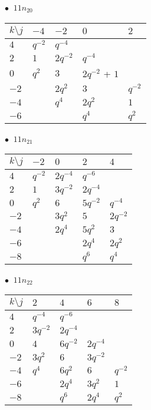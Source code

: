 %
\begin{minipage}{\linewidth}
$\bullet\ $ $11n_{20}$ \vspace{0.5em} \\
\begin{tabular}{l|llll}
$k \setminus j$ & $-4$ & $-2$ & $0$ & $2$ \\
\hline
$4$ & $q^{-2}$ & $q^{-4}$ &  &  \\
$2$ & $1$ & $2q^{-2}$ & $q^{-4}$ &  \\
$0$ & $q^{2}$ & $3$ & $2q^{-2}$ + $1$ &  \\
$-2$ &  & $2q^{2}$ & $3$ & $q^{-2}$ \\
$-4$ &  & $q^{4}$ & $2q^{2}$ & $1$ \\
$-6$ &  &  & $q^{4}$ & $q^{2}$ \\
\end{tabular}
\vspace{2em}
\end{minipage}
%
\begin{minipage}{\linewidth}
$\bullet\ $ $11n_{21}$ \vspace{0.5em} \\
\begin{tabular}{l|llll}
$k \setminus j$ & $-2$ & $0$ & $2$ & $4$ \\
\hline
$4$ & $q^{-2}$ & $2q^{-4}$ & $q^{-6}$ &  \\
$2$ & $1$ & $3q^{-2}$ & $2q^{-4}$ &  \\
$0$ & $q^{2}$ & $6$ & $5q^{-2}$ & $q^{-4}$ \\
$-2$ &  & $3q^{2}$ & $5$ & $2q^{-2}$ \\
$-4$ &  & $2q^{4}$ & $5q^{2}$ & $3$ \\
$-6$ &  &  & $2q^{4}$ & $2q^{2}$ \\
$-8$ &  &  & $q^{6}$ & $q^{4}$ \\
\end{tabular}
\vspace{2em}
\end{minipage}
%
\begin{minipage}{\linewidth}
$\bullet\ $ $11n_{22}$ \vspace{0.5em} \\
\begin{tabular}{l|llll}
$k \setminus j$ & $2$ & $4$ & $6$ & $8$ \\
\hline
$4$ & $q^{-4}$ & $q^{-6}$ &  &  \\
$2$ & $3q^{-2}$ & $2q^{-4}$ &  &  \\
$0$ & $4$ & $6q^{-2}$ & $2q^{-4}$ &  \\
$-2$ & $3q^{2}$ & $6$ & $3q^{-2}$ &  \\
$-4$ & $q^{4}$ & $6q^{2}$ & $6$ & $q^{-2}$ \\
$-6$ &  & $2q^{4}$ & $3q^{2}$ & $1$ \\
$-8$ &  & $q^{6}$ & $2q^{4}$ & $q^{2}$ \\
\end{tabular}
\vspace{2em}
\end{minipage}
